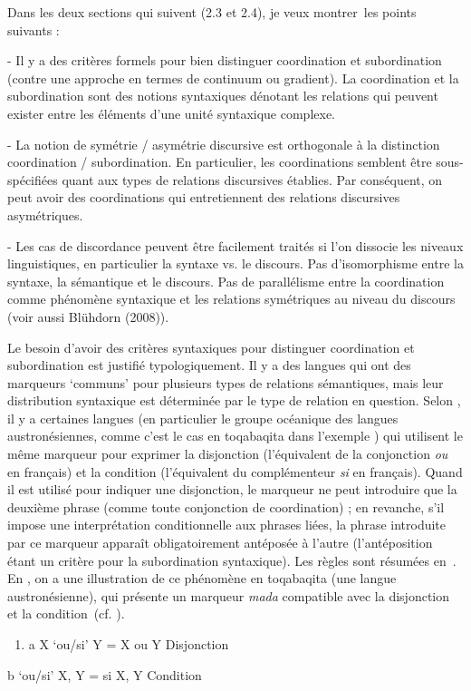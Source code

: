 Dans les deux sections qui suivent (2.3 et 2.4), je veux montrer~les points suivants :

- Il y a des critères formels pour bien distinguer coordination et subordination (contre une approche en termes de continuum ou gradient). La coordination et la subordination sont des notions syntaxiques dénotant les relations qui peuvent exister entre les éléments d'une unité syntaxique complexe.

- La notion de symétrie / asymétrie discursive est orthogonale à la distinction coordination / subordination. En particulier, les coordinations semblent être sous-spécifiées quant aux types de relations discursives établies. Par conséquent, on peut avoir des coordinations qui entretiennent des relations discursives asymétriques.

- Les cas de discordance peuvent être facilement traités si l'on dissocie les niveaux linguistiques, en particulier la syntaxe vs. le discours. Pas d'isomorphisme entre la syntaxe, la sémantique et le discours. Pas de parallélisme entre la coordination comme phénomène syntaxique et les relations symétriques au niveau du discours (voir aussi Blühdorn (2008)).

Le besoin d'avoir des critères syntaxiques pour distinguer coordination et subordination est justifié typologiquement. Il y a des langues qui ont des marqueurs `communs' pour plusieurs types de relations sémantiques, mais leur distribution syntaxique est déterminée par le type de relation en question. Selon \citet{Dixon2009}, il y a certaines langues (en particulier le groupe océanique des langues austronésiennes, comme c'est le cas en toqabaqita dans l'exemple ) qui utilisent le même marqueur pour exprimer la disjonction (l'équivalent de la conjonction \textit{ou} en français) et la condition (l'équivalent du complémenteur \textit{si} en français). Quand il est utilisé pour indiquer une disjonction, le marqueur ne peut introduire que la deuxième phrase (comme toute conjonction de coordination) ; en revanche, s'il impose une interprétation conditionnelle aux phrases liées, la phrase introduite par ce marqueur apparaît obligatoirement antéposée à l'autre (l'antéposition étant un critère pour la subordination syntaxique). Les règles sont résumées en~. En , on a une illustration de ce phénomène en toqabaqita (une langue austronésienne), qui présente un marqueur \textit{mada} compatible avec la disjonction et la condition~(cf. \citet[15]{Dixon2009}).


\begin{enumerate}
\item \label{bkm:Ref270622612}a  X `ou/si' Y = X ou Y  Disjonction


\end{enumerate}
  b  `ou/si' X, Y = si X, Y  Condition


